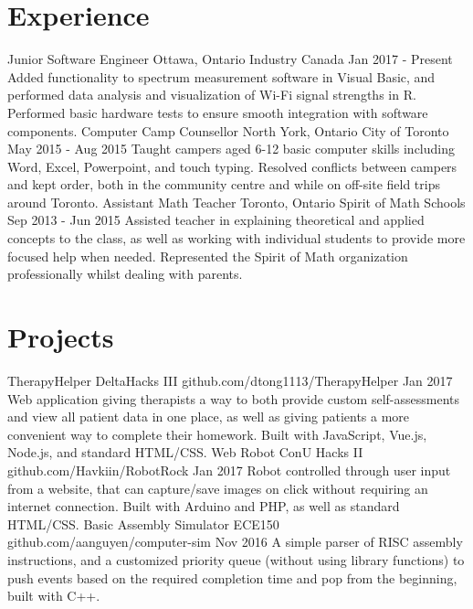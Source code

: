 \documentclass[]{aanguyen_cv}
\begin{document}
	\begin{main}%
		\vspace{35pt}%
		\section{Experience}
			\mainentry%
				{Junior Software Engineer}%
				{Ottawa, Ontario}%
				{Industry Canada}%
				{Jan 2017 - Present}%
				{Added functionality to spectrum measurement software in Visual Basic, and performed data analysis and visualization of Wi-Fi signal strengths in R. Performed basic hardware tests to ensure smooth integration with software components.}
			\mainentry%
				{Computer Camp Counsellor}%
				{North York, Ontario}%
				{City of Toronto}%
				{May 2015 - Aug 2015}%
				{Taught campers aged 6-12 basic computer skills including Word, Excel, Powerpoint, and touch typing. Resolved conflicts between campers and kept order, both in the community centre and while on off-site field trips around Toronto.}
			\mainentry%
				{Assistant Math Teacher}%
				{Toronto, Ontario}%
				{Spirit of Math Schools}%
				{Sep 2013 - Jun 2015}%
				{Assisted teacher in explaining theoretical and applied concepts to the class, as well as working with individual students to provide more focused help when needed. Represented the Spirit of Math organization professionally whilst dealing with parents.}
			\vspace{0.65cm}%
		\section{Projects}
			\mainentry%
				{TherapyHelper {\faGithub}}%
				{DeltaHacks III}%
				{github.com/dtong1113/TherapyHelper}%
				{Jan 2017}%
				{Web application giving therapists a way to both provide custom self-assessments and view all patient data in one place, as well as giving patients a more convenient way to complete their homework. Built with JavaScript, Vue.js, Node.js, and standard HTML/CSS.}
			\mainentry%
				{Web Robot {\faGithub}}%
				{ConU Hacks II}%
				{github.com/Havkiin/RobotRock}%
				{Jan 2017}%
				{Robot controlled through user input from a website, that can capture/save images on click without requiring an internet connection. Built with Arduino and PHP, as well as standard HTML/CSS.}
			\mainentry%
				{Basic Assembly Simulator {\faGithub}}%
				{ECE150}%
				{github.com/aanguyen/computer-sim}%
				{Nov 2016}%
				{A simple parser of RISC assembly instructions, and a customized priority queue (without using library functions) to push events based on the required completion time and pop from the beginning, built with C++.}
			\vspace{0.65cm}%
	\end{main}%
\end{document}
